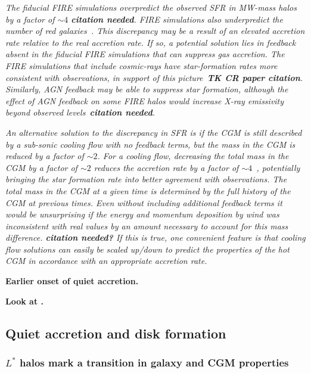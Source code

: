 \documentclass[fleqn,usenatbib]{mnras}
\begin{document}
\textit{
The fiducial FIRE simulations overpredict the observed SFR in MW-mass halos by a factor of $\sim 4$ \textbf{citation needed}.
FIRE simulations also underpredict the number of red galaxies~\citep{Garrison-Kimmel2017}.
This discrepancy may be a result of an elevated accretion rate relative to the real accretion rate.
If so, a potential solution lies in feedback absent in the fiducial FIRE simulations that can suppress gas accretion.
The FIRE simulations that include cosmic-rays have star-formation rates more consistent with observations, in support of this picture~\textbf{TK CR paper citation}.
Similarly, AGN feedback may be able to suppress star formation, although the effect of AGN feedback on some FIRE halos would increase X-ray emissivity beyond observed levels~\textbf{citation needed}. 
}

\textit{
An alternative solution to the discrepancy in SFR is if the CGM is still described by a sub-sonic cooling flow with no feedback terms, but the mass in the CGM is reduced by a factor of  $\sim2$.
For a cooling flow, decreasing the total mass in the CGM by a factor of $\sim 2$ reduces the accretion rate by a factor of $\sim4$~\cite{Stern2019}, potentially bringing the star formation rate into better agreement with observations.
The total mass in the CGM at a given time is determined by the full history of the CGM at previous times.
Even without including additional feedback terms it would be unsurprising if the energy and momentum deposition by wind was inconsistent with real values by an amount necessary to account for this mass difference. \textbf{citation needed?}
If this is true, one convenient feature is that cooling flow solutions can easily be scaled up/down to predict the properties of the hot CGM in accordance with an appropriate accretion rate.
}

\textbf{
Earlier onset of quiet accretion.
}

\textbf{Look at \cite{Dekel2014}.}

\subsection{Quiet accretion and disk formation}
\label{s: disk formation}

\subsubsection{$L^*$ halos mark a transition in galaxy and CGM properties}
\end{document}
